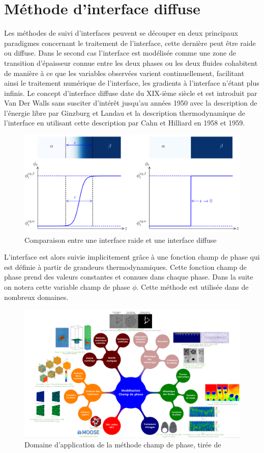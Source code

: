 \section{Méthode d'interface diffuse}

Les méthodes de suivi d'interfaces peuvent se découper en deux principaux paradigmes concernant le traitement de l'interface, cette dernière peut être raide ou diffuse. Dans le second cas l'interface est modélisée comme une zone de transition d'épaisseur connue entre les deux phases ou les deux fluides cohabitent de manière à ce que les variables observées varient continuellement, facilitant ainsi le traitement numérique de l'interface, les gradients à l'interface n'étant plus infinis. Le concept d'interface diffuse date du XIX-ième siècle et est introduit par Van Der Walls sans susciter d'intérêt jusqu'au années 1950 avec la description de l'énergie libre par Ginzburg et Landau et la description thermodynamique de l'interface en utilisant cette description par Cahn et Hilliard en 1958 et 1959.
\begin{figure}[H]
	\centering
	\includegraphics[width=0.7\linewidth]{figure/diffuse_interface}
	\caption{Comparaison entre une interface raide et une interface diffuse}
	\label{fig:diffuseinterface}
\end{figure} 
\noindent L'interface est alors suivie implicitement grâce à une fonction champ de phase qui est définie à partir de grandeurs thermodynamiques. Cette fonction champ de phase prend des valeurs constantes et connues dans chaque phase. Dans la suite on notera cette variable champ de phase $\phi$. Cette méthode est utilisée dans de nombreux domaines.

\begin{figure}[H]
	\centering
	\includegraphics[width=0.9\linewidth]{figure/champ_phase}
	\caption[Domaine d'application de la méthode champ de phase]{Domaine d'application de la méthode champ de phase, tirée de \cite{introini_suivi_nodate}}
	\label{fig:champphase}
\end{figure} 
